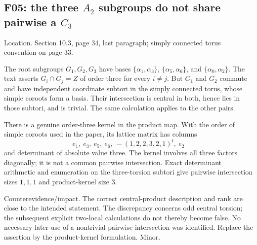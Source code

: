 \documentclass[10pt]{article}
\begin{document}
\subsection*{F05: the three \(A_2\) subgroups do not share pairwise a \(C_3\)}
Location. Section 10.3, page 34, last paragraph; simply connected torus convention on page 33.\par
The root subgroups \(G_1,G_2,G_3\) have bases \(\{\alpha_1,\alpha_3\}\), \(\{\alpha_5,\alpha_6\}\), and \(\{\alpha_0,\alpha_2\}\). The text asserts \(G_i\cap G_j=Z\) of order three for every \(i\ne j\). But \(G_1\) and \(G_2\) commute and have independent coordinate subtori in the simply connected torus, whose simple coroots form a basis. Their intersection is central in both, hence lies in those subtori, and is trivial. The same calculation applies to the other pairs.\par
There is a genuine order-three kernel in the product map. With the order of simple coroots used in the paper, its lattice matrix has columns \[e_1,\ e_3,\ e_5,\ e_6,\ -(1,2,2,3,2,1)^t,\ e_2\] and determinant of absolute value three. The kernel involves all three factors diagonally; it is not a common pairwise intersection. Exact determinant arithmetic and enumeration on the three-torsion subtori give pairwise intersection sizes \(1,1,1\) and product-kernel size \(3\).\par
Counterevidence/impact. The correct central-product description and rank are close to the intended statement. The discrepancy concerns odd central torsion; the subsequent explicit two-local calculations do not thereby become false. No necessary later use of a nontrivial pairwise intersection was identified. Replace the assertion by the product-kernel formulation. Minor.\par
\end{document}
